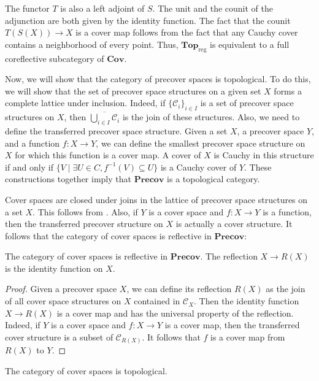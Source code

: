 \documentclass[reqno]{amsart}
\theoremstyle{definition}
\theoremstyle{remark}
\numberwithin{figure}{section}
\newcommand{\cat}[1]{\mathbf{#1}}
\begin{document}
The functor $T$ is also a left adjoint of $S$.
The unit and the counit of the adjunction are both given by the identity function.
The fact that the counit $T(S(X)) \to X$ is a cover map follows from the fact that any Cauchy cover contains a neighborhood of every point.
Thus, $\cat{Top}_\mathrm{reg}$ is equivalent to a full coreflective subcategory of $\cat{Cov}$.

Now, we will show that the category of precover spaces is topological. %
To do this, we will show that the set of precover space structures on a given set $X$ forms a complete lattice under inclusion.
Indeed, if $\{ \mathcal{C}_i \}_{i \in I}$ is a set of precover space structures on $X$, then $\overline{\bigcup_{i \in I} \mathcal{C}_i}$ is the join of these structures.
Also, we need to define the transferred precover space structure.
Given a set $X$, a precover space $Y$, and a function $f : X \to Y$, we can define the smallest precover space structure on $X$ for which this function is a cover map.
A cover of $X$ is Cauchy in this structure if and only if $\{ V \mid \exists U \in C, f^{-1}(V) \subseteq U \}$ is a Cauchy cover of $Y$.
These constructions together imply that $\cat{Precov}$ is a topological category.

Cover spaces are closed under joins in the lattice of precover space structures on a set $X$.
This follows from .
Also, if $Y$ is a cover space and $f : X \to Y$ is a function, then the transferred precover structure on $X$ is actually a cover structure.
It follows that the category of cover spaces is reflective in $\cat{Precov}$:

\begin{prop}
The category of cover spaces is reflective in $\cat{Precov}$.
The reflection $X \to R(X)$ is the identity function on $X$.
\end{prop}
\begin{proof}
Given a precover space $X$, we can define its reflection $R(X)$ as the join of all cover space structures on $X$ contained in $\mathcal{C}_X$.
Then the identity function $X \to R(X)$ is a cover map and has the universal property of the reflection.
Indeed, if $Y$ is a cover space and $f : X \to Y$ is a cover map, then the transferred cover structure is a subset of $\mathcal{C}_{R(X)}$.
It follows that $f$ is a cover map from $R(X)$ to $Y$.
\end{proof}

\begin{cor}
The category of cover spaces is topological.
\end{cor}
\end{document}
